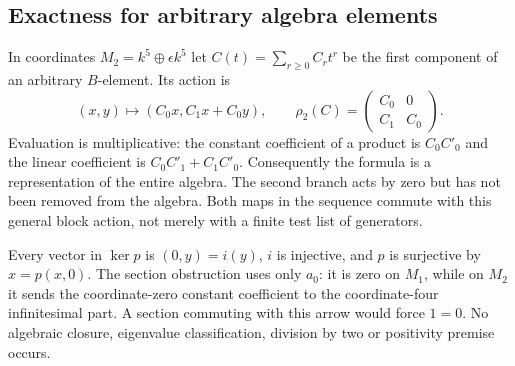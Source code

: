 \documentclass[11pt,oneside,openany]{book}
\theoremstyle{definition}\newtheorem{definition}[theorem]{Definition}
\theoremstyle{remark}\newtheorem{remark}[theorem]{Remark}
\newcommand{\C}{\mathbb C}\newcommand{\Z}{\mathbb Z}\newcommand{\R}{\mathbb R}
\begin{document}
\subsection{Exactness for arbitrary algebra elements}
In coordinates $M_2=k^5\oplus\epsilon k^5$ let
$C(t)=\sum_{r\geq0}C_rt^r$ be the first component of an arbitrary
$B$-element. Its action is
\[
 (x,y)\longmapsto(C_0x,C_1x+C_0y),\qquad
 \rho_2(C)=\begin{pmatrix}C_0&0\\C_1&C_0\end{pmatrix}.
\]
Evaluation is multiplicative: the constant coefficient of a product is
$C_0C'_0$ and the linear coefficient is $C_0C'_1+C_1C'_0$.
Consequently the formula is a representation of the entire algebra.
The second branch acts by zero but has not been removed from the algebra.
Both maps in the sequence commute with this general block action,
not merely with a finite test list of generators.

\begin{center}
\end{center}
Every vector in $\ker p$ is $(0,y)=i(y)$, $i$ is injective, and
$p$ is surjective by $x=p(x,0)$. The section obstruction uses only
$a_0$: it is zero on $M_1$, while on $M_2$ it sends the coordinate-zero
constant coefficient to the coordinate-four infinitesimal part. A section commuting
with this arrow would force $1=0$. No algebraic closure, eigenvalue
classification, division by two or positivity premise occurs.
\end{document}
